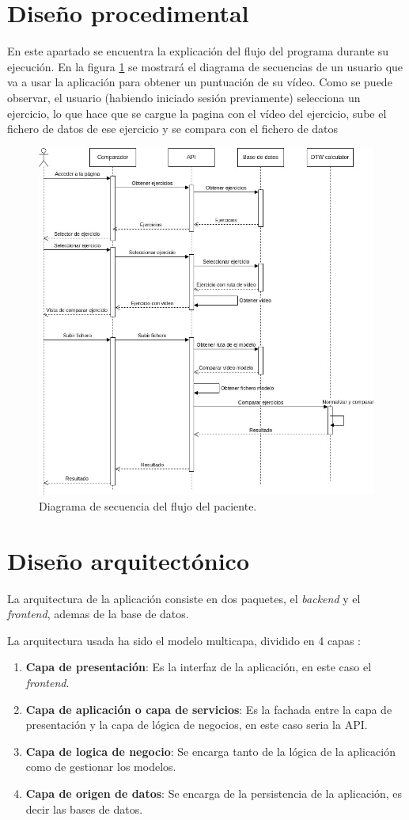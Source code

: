\section{Diseño procedimental}
En este apartado se encuentra la explicación del flujo del programa durante su ejecución. En la figura \ref{fig:diagramasec} se mostrará el diagrama de secuencias de un usuario que va a usar la aplicación para obtener un puntuación de su vídeo. 
Como se puede observar, el usuario (habiendo iniciado sesión previamente) selecciona un ejercicio, lo que hace que se cargue la pagina con el vídeo del ejercicio, sube el fichero de datos de ese ejercicio y se compara con el fichero de datos 
\begin{figure}
	\centering
	\includegraphics[width=0.7\linewidth]{img/diagramaSec}
	\caption{Diagrama de secuencia del flujo del paciente.}
	\label{fig:diagramasec}
\end{figure}

 
\section{Diseño arquitectónico}
La arquitectura de la aplicación consiste en dos paquetes, el \textit{backend} y el \textit{frontend}, ademas de la base de datos. 

La arquitectura usada ha sido el modelo multicapa, dividido en 4 capas \cite{capas}:
\begin{enumerate}
	\item \textbf{Capa de presentación}: Es la interfaz de la aplicación, en este caso el \textit{frontend}.
	\item \textbf{Capa de aplicación o capa de servicios}: Es la fachada entre la capa de presentación y la capa de lógica de negocios, en este caso seria la API.
	\item \textbf{Capa de logica de negocio}: Se encarga tanto de la lógica de la aplicación como de gestionar los modelos.
	\item \textbf{Capa de origen de datos}: Se encarga de la persistencia de la aplicación, es decir las bases de datos.
\end{enumerate}


